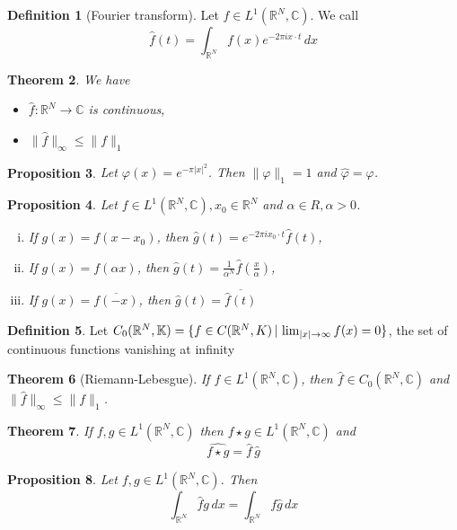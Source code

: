 \documentclass[10pt, oneside, reqno]{amsart}
\theoremstyle{plain}%
\newtheorem{thm}{Theorem}[section]
\newtheorem{prop}[thm]{Proposition}
\theoremstyle{definition}
\newtheorem{defn}[thm]{Definition}
\theoremstyle{remark}
\newcommand{\R}{\mathbb{R}}
\newcommand{\Com}{\mathbb{C}}
\renewcommand{\phi}{\varphi}
\begin{document}
\begin{defn}[Fourier transform]
	Let $f \in L^1(\R^N, \Com)$.  We call \[
		\hat{f}(t) = \int_{\R^N} f(x) e^{-2 \pi i x \cdot t} \, dx
	\]
\end{defn}

\begin{thm}
	We have 
	\begin{itemize}
		\item $\hat{f} : \R^N \rightarrow \Com$ is continuous,
		\item $\|\hat f \|_\infty \leq \|f \|_1$
	\end{itemize}
\end{thm}

\begin{prop}
	Let $\phi(x) = e^{- \pi |x|^2}$.  Then $\|\phi \|_1 = 1$ and $\hat \phi = \phi$.
\end{prop}

\begin{prop}
	Let $f \in L^1(\R^N, \Com), x_0 \in \R^N$ and $\alpha \in R, \alpha > 0$. 
	\begin{enumerate}[(i)]
		\item If $g(x) = f(x - x_0)$, then $\hat g (t) = e^{-2 \pi i x_0 \cdot t} \hat f (t)$,
		\item If $g(x) = f(\alpha x)$, then $\hat g (t) = \frac{1}{\alpha^N} \hat f \left( \frac{x}{\alpha}\right)$,
		\item \vspace{0.1cm} If $g(x) = \overline{f(-x)}$, then $\hat g (t) = \overline{\hat f(t)}$
	\end{enumerate}
\end{prop}

\begin{defn}
	Let $C_0(\R^N, \K) = \{ f \in C(\R^N, K) \, | \, \lim_{|x| \rightarrow \infty} f(x) = 0 \}$, the set of continuous functions vanishing at infinity
\end{defn}

\begin{thm}[Riemann-Lebesgue]
	If $f \in L^1(\R^N, \Com)$, then $\hat f \in C_0(\R^N, \Com)$ and $\| \hat f \|_\infty \leq \|f \|_1$.
\end{thm}

\begin{thm}
	If $f,g \in L^1(\R^N, \Com)$ then $f \star g \in L^1(\R^N, \Com)$ and \[
		\hat{f \star g} = \hat f \, \hat g
	\]
\end{thm}
\begin{prop}
	Let $f,g \in L^1(\R^N, \Com)$.  Then \[
		\int_{\R^N} \hat f g \, dx = \int_{\R^N} f \hat g \, dx
	\]
\end{prop}
\end{document}

